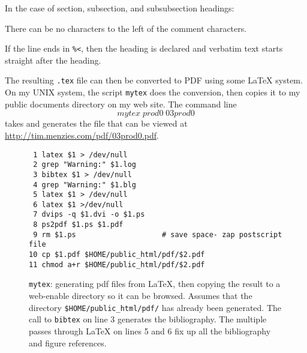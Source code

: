 In the case of section, subsection, and subsubsection headings:
\bi \item There can be no characters to the left of the comment
characters. \item If the line ends in {\tt \%<}, then the heading
is declared and verbatim text starts straight after the heading.
\ei

The resulting  {\tt *.tex} file can then be converted to PDF using
some {\LaTeX} system. On my UNIX system, the script {\tt mytex} does the
conversion, then copies it to my public documents directory on my web site.
The command line
\[
mytex\; prod0\; 03prod0
\]
takes  and generates the file that can be viewed at
\url{http://tim.menzies.com/pdf/03prod0.pdf}.

\begin{figure}
{\scriptsize \begin{verbatim}
 1 latex $1 > /dev/null
 2 grep "Warning:" $1.log
 3 bibtex $1 > /dev/null
 4 grep "Warning:" $1.blg
 5 latex $1 > /dev/null
 6 latex $1 >/dev/null
 7 dvips -q $1.dvi -o $1.ps
 8 ps2pdf $1.ps $1.pdf
 9 rm $1.ps                    # save space- zap postscript file
10 cp $1.pdf $HOME/public_html/pdf/$2.pdf
11 chmod a+r $HOME/public_html/pdf/$2.pdf
\end{verbatim}}
\caption[{\tt mytex}: generating pdf files from {\LaTeX}]{{\tt mytex}: generating pdf files from {\LaTeX}, then
copying the result to a web-enable directory so it can be browsed.
Assumes that the directory {\tt \$HOME/public_html/pdf/} has already been generated.
The call to {\tt bibtex} on line 3 generates the bibliography.
The multiple passes through {\LaTeX} on lines 5 and 6 fix up all the bibliography
and figure references.}\label{fig:mytex}
\end{figure}
